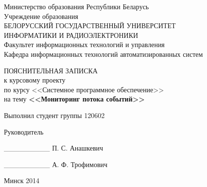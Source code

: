 \begin{titlepage}
\thispagestyle{empty}
\setlength{\parindent}{0ex} %

\begin{center}
  Министерство образования Республики Беларусь \\
  \smallskip
  Учреждение образования \\
  БЕЛОРУССКИЙ ГОСУДАРСТВЕННЫЙ УНИВЕРСИТЕТ \\
  ИНФОРМАТИКИ И РАДИОЭЛЕКТРОНИКИ \\
  \smallskip
  Факультет информационных технологий и управления \\
  \smallskip
  Кафедра информационных технологий автоматизированных систем
\end{center}

\vspace{50mm}

\begin{center}
  ПОЯСНИТЕЛЬНАЯ ЗАПИСКА \\
  к курсовому проекту \\
  по курсу <<Системное программное обеспечение>> \\
  на тему \textbf{<<Мониторинг потока событий>>} \\
\end{center}

\vspace{45mm}

\begin{minipage}{.55\linewidth}
    Выполнил студент группы 120602

    \smallskip

    Руководитель
\end{minipage}
\hfill
\begin{minipage}{.4\linewidth}
  \begin{flushright}
    \_\_\_\_\_\_\_\_\_ \hspace{1.7mm} П. С. Анашкевич

    \smallskip

    \_\_\_\_\_\_\_\_\_ А. Ф. Трофимович
  \end{flushright}
\end{minipage}

\vspace{50mm}
\begin{center}
  Минск 2014
\end{center}

\setlength{\parindent}{5ex} %
\end{titlepage}
